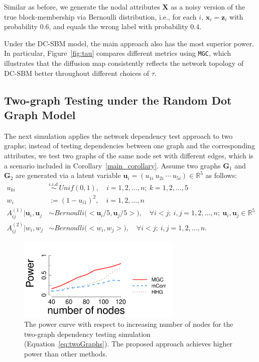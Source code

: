 \documentclass[12pt]{article}
\theoremstyle{definition}
\begin{document}
	Similar as before, we generate the nodal attributes $\mathbf{X}$ as a noisy version of the true block-membership via Bernoulli distribution, i.e., for each $i$, $\mathbf{x}_{i}= \mathbf{z}_{i}$ with probability $0.6$, and equals the wrong label with probability $0.4$.
	
	Under the DC-SBM model, the main approach also has the most superior power. In particular, Figure~\ref{fig:tau} compares different metrics using \texttt{MGC}, which illustrates that the diffusion map consistently reflects the network topology of DC-SBM better throughout different choices of $\tau$.
	
	\subsection{Two-graph Testing under the Random Dot Graph Model}
	\label{ssec:twographs}
	
	The next simulation applies the network dependency test approach to two graphs; instead of testing dependencies between one graph and the corresponding attributes, we test two graphs of the same node set with different edges, which is a scenario included in Corollary~\ref{main_corollary}. 
	Assume two graphs $\mathbf{G}_{1}$ and $\mathbf{G}_{2}$ are generated via a latent variable $\mathbf{u}_{i} = ( u_{1i}~ u_{2i}~ \cdots ~u_{5i} ) \in \mathbb{R}^{5}$ as follows:
	\begin{equation}
		\begin{split}
			u_{ki} & \overset{i.i.d.}{\sim} Unif(0, 1), \quad i = 1,2, \ldots, n;~k = 1,2,\ldots, 5 \\
			w_{i} & := (1- u_{i1} )^{2}, \quad i = 1,2, \ldots, n \\
			A^{(1)}_{ij} \big| \mathbf{u}_{i}, \mathbf{u}_{j} & \sim Bernoulli \big( <\mathbf{u}_{i}/5, \mathbf{u}_{j}/5  > \big), \quad \forall i < j;~i,j=1,2,\ldots,n;~\mathbf{u}_{i}, \mathbf{u}_{j} \in \mathbb{R}^{5} \\
			A^{(2)}_{ij} \big| w_{i}, w_{j} & \sim Bernoulli \big( <w_{i}, w_{j}  > \big), \quad \forall i < j;~i,j=1,2,\ldots,n.
		\end{split}
		\label{eq:twoGraphs}
	\end{equation}
	
	\begin{figure}[ht]
		\centering
		\includegraphics[width=0.7\textwidth]{../Figure/Graphs.pdf}
		\caption{The power curve with respect to increasing number of nodes for the two-graph dependency testing simulation (Equation~\ref{eq:twoGraphs}). The proposed approach achieves higher power than other methods.}
		\label{fig:graphtest}
	\end{figure}
	
\end{document}
